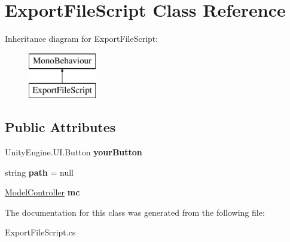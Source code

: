 \hypertarget{class_export_file_script}{}\section{Export\+File\+Script Class Reference}
\label{class_export_file_script}
Inheritance diagram for Export\+File\+Script\+:\begin{figure}[H]
\begin{center}
\leavevmode
\includegraphics[height=2.000000cm]{class_export_file_script}
\end{center}
\end{figure}
\subsection*{Public Attributes}
\begin{DoxyCompactItemize}
\item 
\mbox{\label{class_export_file_script_a2e4ef21d66a1ce7ee1a3c578f85b6ff8}} 
Unity\+Engine.\+U\+I.\+Button {\bfseries your\+Button}
\item 
\mbox{\label{class_export_file_script_a364eb6176f7876754539dd3812b3fa08}} 
string {\bfseries path} = null
\item 
\mbox{\label{class_export_file_script_a22da1b1ddd76aa4e037c1200ee678bda}} 
\hyperlink{class_model_controller}{Model\+Controller} {\bfseries mc}
\end{DoxyCompactItemize}


The documentation for this class was generated from the following file\+:\begin{DoxyCompactItemize}
\item 
Export\+File\+Script.\+cs\end{DoxyCompactItemize}
